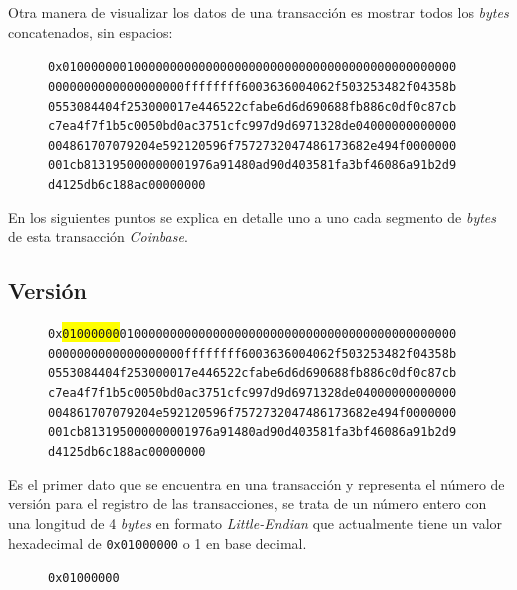 \documentclass{article}
\begin{document}
    Otra manera de visualizar los datos de una transacción es mostrar todos los \textit{bytes} concatenados, sin espacios:
    
    \begin{figure}[H]
        \texttt{0x0100000001000000000000000000000000000000000000000000000} \\
        \texttt{0000000000000000000ffffffff6003636004062f503253482f04358b} \\
        \texttt{0553084404f253000017e446522cfabe6d6d690688fb886c0df0c87cb} \\
        \texttt{c7ea4f7f1b5c0050bd0ac3751cfc997d9d6971328de04000000000000} \\
        \texttt{004861707079204e592120596f7572732047486173682e494f0000000} \\
        \texttt{001cb813195000000001976a91480ad90d403581fa3bf46086a91b2d9} \\
        \texttt{d4125db6c188ac00000000}
    \end{figure}
    
    En los siguientes puntos se explica en detalle uno a uno cada segmento de \textit{bytes} de esta transacción \textit{Coinbase}.
    
    \subsection{Versión}
    
    \begin{figure}[H]
        \texttt{0x\colorbox{Yellow}{01000000}01000000000000000000000000000000000000000000000} \\
        \texttt{0000000000000000000ffffffff6003636004062f503253482f04358b} \\
        \texttt{0553084404f253000017e446522cfabe6d6d690688fb886c0df0c87cb} \\
        \texttt{c7ea4f7f1b5c0050bd0ac3751cfc997d9d6971328de04000000000000} \\
        \texttt{004861707079204e592120596f7572732047486173682e494f0000000} \\
        \texttt{001cb813195000000001976a91480ad90d403581fa3bf46086a91b2d9} \\
        \texttt{d4125db6c188ac00000000}
    \end{figure}
    
    Es el primer dato que se encuentra en una transacción y representa el número de versión para el registro de las transacciones, se trata de un número entero con una longitud de 4 \textit{bytes} en formato \textit{Little-Endian} que actualmente tiene un valor hexadecimal de \texttt{0x01000000} o 1 en base decimal.
    \begin{figure}[H]
        \texttt{0x01000000}
    \end{figure}
    
\end{document}
